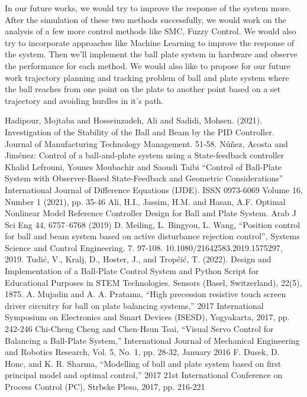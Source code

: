 \documentclass[conference]{IEEEtran}
\begin{document}
In our future works, we would try to improve the response of the system more. After the simulation of these two methods successfully, we would work on the analysis of a few more control methods like SMC, Fuzzy Control. We would also try to incorporate approaches like Machine Learning to improve the response of the system. Then we'll implement the ball plate system in hardware and observe the performance for each method. We would also like to propose for our future work trajectory planning and tracking problem of ball and plate system where the ball reaches from one point on the plate to another point based on a set trajectory and avoiding hurdles in it's path. 
\begin{thebibliography}{00}
 Hadipour, Mojtaba and Hosseinzadeh, Ali and Sadidi, Mohsen. (2021). Investigation of the Stability of the Ball and Beam by the PID Controller. Journal of Manufacturing Technology Management. 51-58.
 Núñez, Acosta and Jiménez: Control of a ball-and-plate system using a State-feedback controller
  Khalid Lefrouni, Younes Moubachir and Saoudi Taibi “Control of Ball-Plate System with Observer-Based State-Feedback and Geometric Considerations” International Journal of Difference Equations (IJDE). ISSN 0973-6069 Volume 16, Number 1 (2021), pp. 35-46
Ali, H.I., Jassim, H.M. and Hasan, A.F. Optimal Nonlinear Model Reference Controller Design for Ball and Plate System. Arab J Sci Eng 44, 6757–6768 (2019)
 D. Meiling, L. Bingyou, L. Wang, “Position control for ball and beam system based on active disturbance rejection control”, Systems Science and Control Engineering. 7. 97-108. 10.1080/21642583.2019.1575297, 2019.
 Tudić, V., Kralj, D., Hoster, J., and Tropčić, T. (2022). Design and Implementation of a Ball-Plate Control System and Python Script for Educational Purposes in STEM Technologies. Sensors (Basel, Switzerland), 22(5), 1875. 
 A. Mujadin and A. A. Pratama, “High precession resistive touch screen driver circuitry for ball on plate balancing systems,” 2017 International Symposium on Electronics and Smart Devices (ISESD), Yogyakarta, 2017, pp. 242-246 
 Chi-Cheng Cheng and Chen-Hsun Tsai, “Visual Servo Control for Balancing a Ball-Plate System,” International Journal of Mechanical Engineering and Robotics Research, Vol. 5, No. 1, pp. 28-32, January 2016
 F. Dusek, D. Honc, and K. R. Sharma, “Modelling of ball and plate system based on first principal model and optimal control,” 2017 21st International Conference on Process Control (PC), Strbske Pleso, 2017, pp. 216-221

\end{thebibliography}
\end{document}
